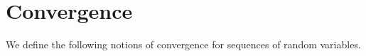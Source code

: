 \section{Convergence}
%
%
%
%
We define the following notions of convergence for sequences of random variables.
